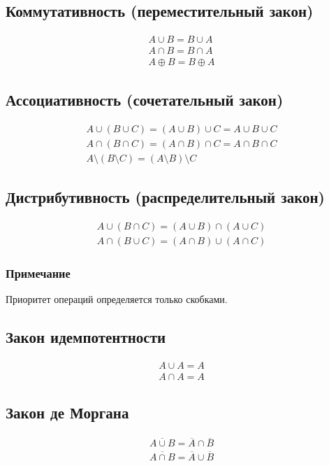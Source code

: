 \documentclass{article}
\begin{document}
\subsection{Коммутативность (переместительный закон)}
\begin{gather*}
    A \cup B = B \cup A \\
    A \cap B = B \cap A \\
    A \oplus B = B \oplus A
\end{gather*}


\subsection{Ассоциативность (сочетательный закон)}
\begin{gather*}
    A \cup (B \cup C) = (A \cup B) \cup C = A \cup B \cup C \\
    A \cap (B \cap C) = (A \cap B) \cap C = A \cap B \cap C \\
    A \setminus (B \setminus C) = (A \setminus B) \setminus C
\end{gather*}


\subsection{Дистрибутивность (распределительный закон)}
\begin{gather*}
    A \cup (B \cap C) = (A \cup B) \cap (A \cup C) \\
    A \cap (B \cup C) = (A \cap B) \cup (A \cap C)
\end{gather*}

\subsubsection{Примечание}
Приоритет операций определяется только скобками.


\subsection{Закон идемпотентности}
\begin{gather*}
    A \cup A = A \\
    A \cap A = A
\end{gather*}


\subsection{Закон де Моргана}
\begin{gather*}
    \overline{A \cup B} = \overline{A} \cap \overline{B} \\
    \overline{A \cap B} = \overline{A} \cup \overline{B}
\end{gather*}
\end{document}
